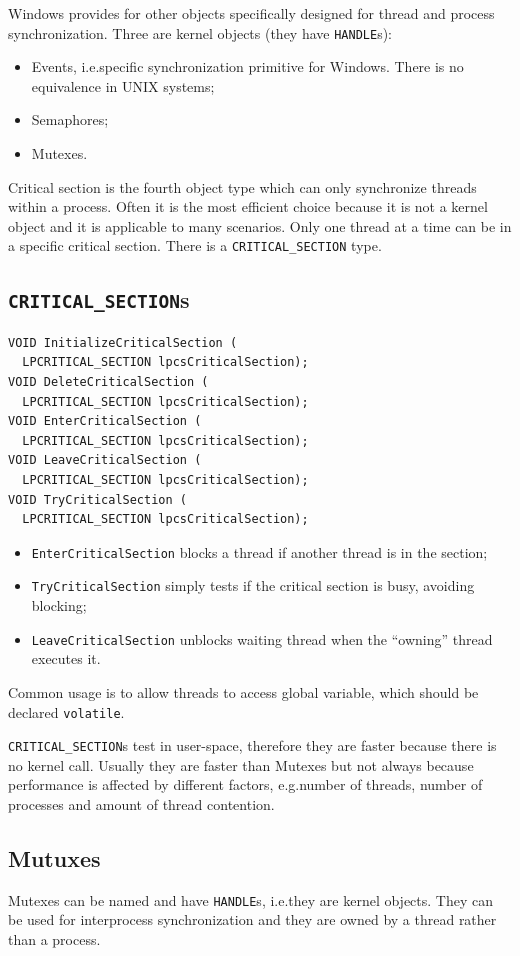 Windows provides for other objects specifically designed for thread and process synchronization. Three are kernel objects (they have \texttt{HANDLE}s):
\begin{itemize}
\item Events, i.e.\@ specific synchronization primitive for Windows. There is no equivalence in UNIX systems;
\item Semaphores;
\item Mutexes.
\end{itemize}
Critical section is the fourth object type which can only synchronize threads within a process. Often it is the most efficient choice because it is not a kernel object and it is applicable to many scenarios. Only one thread at a time can be in a specific critical section. There is a \texttt{CRITICAL\_SECTION} type.

\subsection{\texttt{CRITICAL\_SECTION}s}
\begin{verbatim}
VOID InitializeCriticalSection (
  LPCRITICAL_SECTION lpcsCriticalSection);
VOID DeleteCriticalSection (
  LPCRITICAL_SECTION lpcsCriticalSection);
VOID EnterCriticalSection (
  LPCRITICAL_SECTION lpcsCriticalSection);
VOID LeaveCriticalSection (
  LPCRITICAL_SECTION lpcsCriticalSection);
VOID TryCriticalSection (
  LPCRITICAL_SECTION lpcsCriticalSection);
\end{verbatim}

\begin{itemize}
\item \texttt{EnterCriticalSection} blocks a thread if another thread is in the section;
\item \texttt{TryCriticalSection} simply tests if the critical section is busy, avoiding blocking;
\item \texttt{LeaveCriticalSection} unblocks waiting thread when the ``owning'' thread executes it.
\end{itemize}
Common usage is to allow threads to access global variable, which should be declared \texttt{volatile}.

\texttt{CRITICAL\_SECTION}s test in user-space, therefore they are faster because there is no kernel call. Usually they are faster than Mutexes but not always because performance is affected by different factors, e.g.\@ number of threads, number of processes and amount of thread contention.

\subsection{Mutuxes}
Mutexes can be named and have \texttt{HANDLE}s, i.e.\@ they are kernel objects. They can be used for interprocess synchronization and they are owned by a thread rather than a process.


